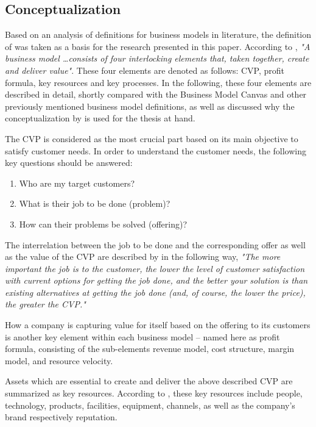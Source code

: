 \subsection{Conceptualization}\label{ch:sota:bmc}

Based on an analysis of definitions for business models in literature, the definition of \citet{Johnson2008} was taken as a basis for the research presented in this paper. According to \citet[p. 52]{Johnson2008}, \textit{"A business model \ldots consists of four interlocking elements that, taken together, create and deliver value"}. These four elements are denoted as follows: \ac{CVP}, profit formula, key resources and key processes. In the following, these four elements are described in detail, shortly compared with the Business Model Canvas \citep{Osterwalder2010} and other previously mentioned business model definitions, as well as discussed why the conceptualization by \citet{Johnson2008} is used for the thesis at hand.

The \ac{CVP} is considered as the most crucial part based on its main objective to satisfy customer needs. In order to understand the customer needs, the following key questions should be answered: 

\begin{enumerate}[parsep=0pt, topsep=0pt, itemsep=0pt]
	\item Who are my target customers?
	\item What is their job to be done (problem)?
	\item How can their problems be solved (offering)? 
\end{enumerate}

The interrelation between the job to be done and the corresponding offer as well as the value of the \ac{CVP} are described by  \citet[p. 52]{Johnson2008} in the following way, \textit{"The more important the job is to the customer, the lower the level of customer satisfaction with current options for getting the job done, and the better your solution is than existing alternatives at getting the job done (and, of course, the lower the price), the greater the CVP."}

How a company is capturing value for itself based on the offering to its customers is another key element within each business model -- named here as profit formula, consisting of the sub-elements revenue model, cost structure, margin model, and resource velocity.

Assets which are essential to create and deliver the above described \ac{CVP} are summarized as key resources. According to \citet[p. 53]{Johnson2008}, these key resources include people, technology, products, facilities, equipment, channels, as well as the company's brand respectively reputation.

